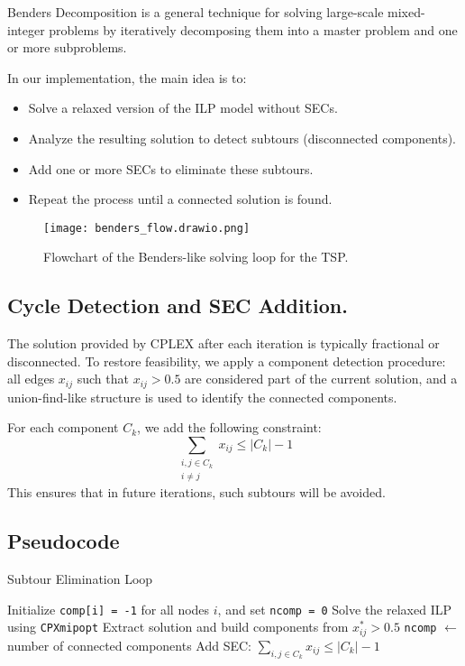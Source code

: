 Benders Decomposition is a general technique for solving large-scale mixed-integer problems by iteratively decomposing them into a master problem and one or more subproblems. 

In our implementation, the main idea is to:
\begin{itemize}
    \item Solve a relaxed version of the ILP model without SECs.
    \item Analyze the resulting solution to detect subtours (disconnected components).
    \item Add one or more SECs to eliminate these subtours.
    \item Repeat the process until a connected solution is found.
\end{itemize}

\begin{figure}[H]
    \centering
    \texttt{[image: benders\_flow.drawio.png]}
    \caption{Flowchart of the Benders-like solving loop for the TSP.}
    \label{fig:benders_flowchart}
\end{figure}

\subsection{Cycle Detection and SEC Addition.}
The solution provided by CPLEX after each iteration is typically fractional or disconnected. To restore feasibility, we apply a component detection procedure: all edges \( x_{ij} \) such that \( x_{ij} > 0.5 \) are considered part of the current solution, and a union-find-like structure is used to identify the connected components.

For each component \( C_k \), we add the following constraint:
\[
\sum_{\substack{i,j \in C_k \\ i \neq j}} x_{ij} \leq |C_k| - 1
\]
This ensures that in future iterations, such subtours will be avoided.

\subsection{Pseudocode}
\begin{algorithm}[H]
\caption{Subtour Elimination Loop}
\begin{algorithmic}[1]
\State Initialize \texttt{comp[i] = -1} for all nodes $i$, and set \texttt{ncomp = 0}
\Repeat
    \State Solve the relaxed ILP using \texttt{CPXmipopt}
    \State Extract solution and build components from $x^*_{ij} > 0.5$
    \State \texttt{ncomp} $\gets$ number of connected components
            \State Add SEC: $\sum_{i,j \in C_k} x_{ij} \leq |C_k| - 1$
        \EndFor
    \EndIf
{}
\end{algorithmic}
\end{algorithm}

